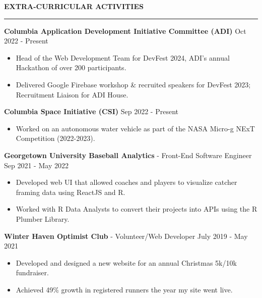 \documentclass[10pt,letterpaper]{article}
\begin{document}
\medskip
\MakeUppercase{{\bf Extra-Curricular Activities}}
\medskip
\hrule
\begin{list}{}{\setlength{\leftmargin}{0em}}
    \item
          \textbf{Columbia Application Development Initiative Committee (ADI)} \hfill Oct 2022 - Present
          \begin{itemize}
              \item Head of the Web Development Team for DevFest 2024, ADI's annual Hackathon of over 200 participants.  \
              \item Delivered Google Firebase workshop \& recruited speakers for DevFest 2023; Recruitment Liaison for ADI House.
          \end{itemize}
    \item
          \textbf{Columbia Space Initiative (CSI)} \hfill Sep 2022 - Present
          \begin{itemize}
              \item Worked on an autonomous water vehicle as part of the NASA Micro-g NExT Competition (2022-2023).
          \end{itemize}
    \item
          \textbf{Georgetown University Baseball Analytics} - Front-End Software Engineer \hfill Sep 2021 - May 2022
          \begin{itemize}
              \item Developed web UI that allowed coaches and players to visualize catcher framing data using ReactJS and R. \
              \item Worked with R Data Analysts to convert their projects into APIs using the R Plumber Library.
          \end{itemize}

    \item
          \textbf{Winter Haven Optimist Club} - Volunteer/Web Developer \hfill July 2019 - May 2021
          \begin{itemize}
              \item Developed and designed a new website for an annual Christmas 5k/10k fundraiser.
              \item Achieved 49\% growth in registered runners the year my site went live.
          \end{itemize}
\end{list}

\end{document}

